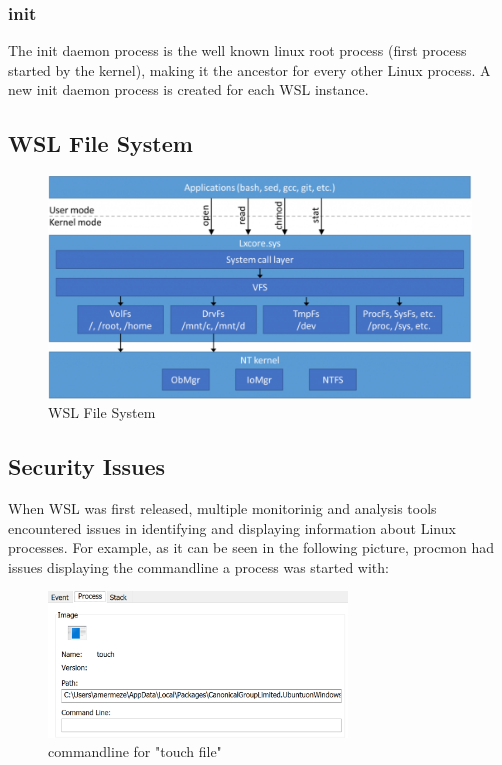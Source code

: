             \subsubsection{init}
            The init daemon process is the well known linux root process (first process started by the kernel), making it the ancestor for
            every other Linux process. A new init daemon process is created for each WSL instance.


        \subsection{WSL File System}
            \begin{figure}[H]
                \includegraphics[width=\linewidth]{img/wsl_file_system.png}
                \caption{WSL File System}
                \label{fig:wsl_file_system}
            \end{figure}
        
        \subsection{Security Issues}
            When WSL was first released, multiple monitorinig and analysis tools encountered issues in identifying and displaying information
            about Linux processes. For example, as it can be seen in the following picture, procmon had issues displaying the commandline a process
            was started with:

            \begin{figure}[!htp]
                \centering
                \includegraphics[width=300px, keepaspectratio]{img/procmon.png}
                \caption{commandline for "touch file"}
                \label{fig:procmon}
            \end{figure}

